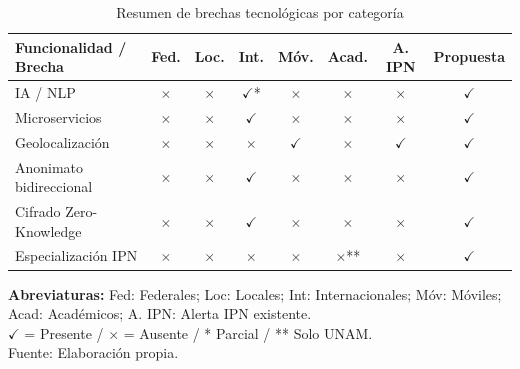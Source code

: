 \begin{table}[htbp]
\centering
\caption{Resumen de brechas tecnológicas por categoría}
\label{tab:resumen_brechas}
\small
\begin{tabular}{|l|c|c|c|c|c|c|c|}
\hline
\textbf{Funcionalidad / Brecha} & \textbf{Fed.} & \textbf{Loc.} & \textbf{Int.} & \textbf{Móv.} & \textbf{Acad.} & \textbf{A. IPN} & \textbf{Propuesta} \\ \hline
IA / NLP                        & $\times$      & $\times$      & $\checkmark$* & $\times$      & $\times$       & $\times$        & \textbf{$\checkmark$} \\ \hline
Microservicios                  & $\times$      & $\times$      & $\checkmark$  & $\times$      & $\times$       & $\times$        & \textbf{$\checkmark$} \\ \hline
Geolocalización                 & $\times$      & $\times$      & $\times$      & $\checkmark$  & $\times$       & $\checkmark$    & \textbf{$\checkmark$} \\ \hline
Anonimato bidireccional         & $\times$      & $\times$      & $\checkmark$  & $\times$      & $\times$       & $\times$        & \textbf{$\checkmark$} \\ \hline
Cifrado Zero-Knowledge          & $\times$      & $\times$      & $\checkmark$  & $\times$      & $\times$       & $\times$        & \textbf{$\checkmark$} \\ \hline
Especialización IPN             & $\times$      & $\times$      & $\times$      & $\times$      & $\times$** & $\times$        & \textbf{$\checkmark$} \\ \hline
\end{tabular}

\smallskip
\scriptsize
\textbf{Abreviaturas:} Fed: Federales; Loc: Locales; Int: Internacionales; Móv: Móviles; Acad: Académicos; A. IPN: Alerta IPN existente.\\
$\checkmark$ = Presente / $\times$ = Ausente / * Parcial / ** Solo UNAM.\\
Fuente: Elaboración propia.
\end{table}

